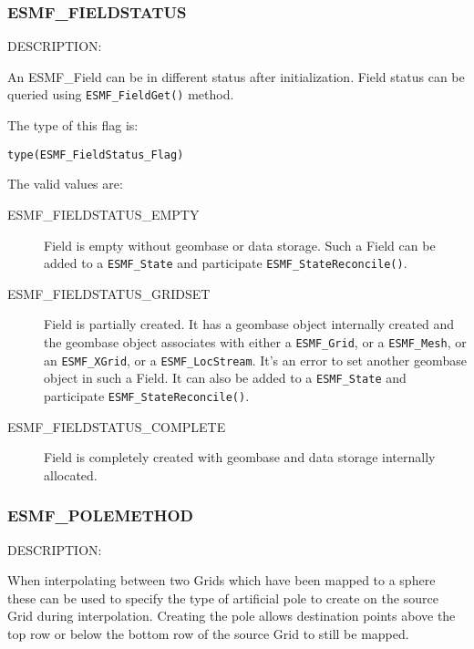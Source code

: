 
\subsubsection{ESMF\_FIELDSTATUS}
\label{const:fieldstatus}

{\sf DESCRIPTION:\\}  
\begin{sloppypar}
An {ESMF\_Field} can be in different status after initialization. Field status can be queried using {\tt ESMF\_FieldGet()} method.
\end{sloppypar}

The type of this flag is:

{\tt type(ESMF\_FieldStatus\_Flag)}

The valid values are:
\begin{description}
\item [ESMF\_FIELDSTATUS\_EMPTY]
      Field is empty without geombase or data storage. Such a Field can be added to a {\tt ESMF\_State} and participate {\tt ESMF\_StateReconcile()}. 
\item [ESMF\_FIELDSTATUS\_GRIDSET]
      Field is partially created. It has a geombase object internally created and the geombase object associates with either a {\tt ESMF\_Grid}, or a {\tt ESMF\_Mesh}, or an {\tt ESMF\_XGrid}, or a {\tt ESMF\_LocStream}. It's an error to set another geombase object in such a Field. It can also be added to a {\tt ESMF\_State} and participate {\tt ESMF\_StateReconcile()}.
\item [ESMF\_FIELDSTATUS\_COMPLETE]
      Field is completely created with geombase and data storage internally allocated. 
\end{description}

\subsubsection{ESMF\_POLEMETHOD}
\label{const:polemethod}

{\sf DESCRIPTION:\\}  
\begin{sloppypar}
When interpolating between two Grids which have been mapped to a sphere these can be used to specify the type of artificial pole to create on the source Grid during interpolation. Creating the pole allows destination points above the top row or below the bottom row of the source Grid to still be mapped.
\end{sloppypar}

